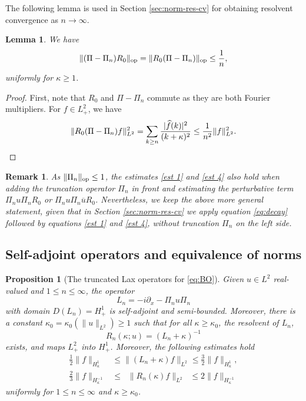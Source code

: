 \documentclass [11pt] {article}
\newtheorem{prop}[thm]{Proposition}
\newtheorem{lem}[thm]{Lemma}
\newtheorem{rem}[thm]{Remark}
\newcommand{\<}{\langle}
\renewcommand{\>}{\rangle}
\newcommand{\wh}[1]{\widehat{#1}}
\newcommand{\op}{\textup{op}}
\begin{document}


The following lemma is used in Section \ref{sec:norm-res-cv} for obtaining resolvent convergence as $n\to \infty$.
\begin{lem}
We have
\begin{equation}\label{eq:decay}
\| (\Pi-\Pi_n)R_0\|_{\op} = \| R_0(\Pi-\Pi_n)\|_{\op} \le \frac{1}{n},
\end{equation}
uniformly for  $\kappa\geq 1$.
\end{lem}
\begin{proof}
First, note that $R_0$ and $\Pi-\Pi_n$ commute as they are both Fourier multipliers. For $f\in L^2_{+} $, we have
\[
\| R_0(\Pi-\Pi_n)f\|_{L^2}^2 = \sum_{k\ge n}\frac{|\wh f(k)|^2}{(k + \kappa)^2} \le \frac{1}{n^2} \| f\|_{L^2}^2 .
\qedhere
\]
\end{proof}

\begin{rem}\label{rem:pert}
As $\| \Pi_n \|_{\op} \le 1$, the estimates \eqref{est 1} and \eqref{est 4} also hold when adding the truncation operator $\Pi_n$ in front and estimating the perturbative term $\Pi_nu\Pi_n R_0$ or $\Pi_n u\Pi_n \overline{u}R_0$. Nevertheless, we keep the above more general statement, given that in Section \ref{sec:norm-res-cv} we apply equation \eqref{eq:decay} followed by equations \eqref{est 1} and \eqref{est 4}, without truncation  $\Pi_n$ on the left side.
\end{rem}

\subsection{Self-adjoint operators and equivalence of norms}\label{sec:adj-equiv}

\begin{prop}[The truncated Lax operators for \eqref{eq:BO}]
\label{prop:lax}
Given $u\in L^2$ real-valued and $1 \le n \le \infty$, the operator
\begin{equation*}
L_n  = -i\partial_x - \Pi_n  u \Pi_n 
\end{equation*}
with domain $D(L_n) = H^1_+$ is self-adjoint and semi-bounded.  Moreover, there is a constant $\kappa_0 = \kappa_0(\|u\|_{L^2}) \geq 1$ such that for all $\kappa\geq\kappa_0$, the resolvent of $L_n$,
\[
R_n(\kappa;u) = (L_n + \kappa)^{-1}
\] 
exists, and maps $L^2_+$ into $H^{1}_+$. Moreover, the following estimates hold 
\begin{align}
\tfrac12\|f\|_{H^1_\kappa} &\le \| (L_n+\kappa)f \|_{L^2} \le \tfrac32 \|f\|_{H^1_\kappa} ,
\label{L} \\
\tfrac23\| f\|_{H^{-1}_\kappa} &\le\;\; \| R_n(\kappa)f \|_{L^2}\;\; \le2 \| f\|_{H^{-1}_\kappa}
\label{R}
\end{align}
uniformly for $1\leq n\leq \infty$ and $\kappa\geq\kappa_0$.
\end{prop}
\end{document}
